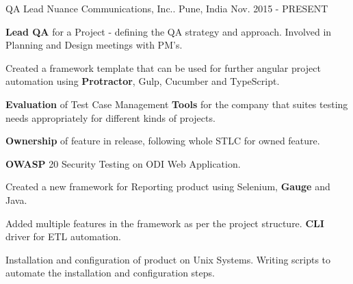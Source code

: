 

\begin{cventries}

  \cventry
    {QA Lead} %
    {Nuance Communications, Inc..} %
    {Pune, India} %
    {Nov. 2015 - PRESENT} %
    {
      \begin{cvitems} %
	    \item {\textbf{Lead QA} for a Project - defining the QA strategy and approach. Involved in Planning and Design meetings with PM's.}
		\item {Created a framework template that can be used for further angular project automation using \textbf{Protractor}, Gulp, Cucumber and TypeScript.}
		\item {\textbf{Evaluation} of Test Case Management \textbf{Tools} for the company that suites testing needs appropriately for different kinds of projects.}
        \item {\textbf{Ownership} of feature in release, following whole STLC for owned feature.}
		\item {\textbf{OWASP} 20 Security Testing on ODI Web Application.}
        \item {Created a new framework for Reporting product using Selenium, \textbf{Gauge} and Java.}
        \item {Added multiple features in the framework as per the project structure. \textbf{CLI} driver for ETL automation.}
        \item {Installation and configuration of product on Unix Systems. Writing scripts to automate the installation and configuration steps.}
      \end{cvitems}
    }


\end{cventries}
